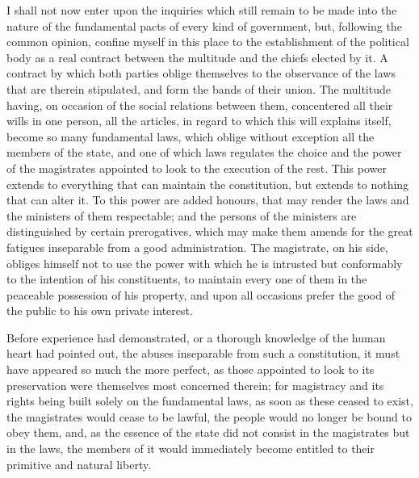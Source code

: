 \documentclass[11pt,twocolumn]{ltugboat}
\begin{document}
I shall not now enter upon the inquiries which still remain to be made
into the nature of the fundamental pacts of every kind of government,
but, following the common opinion, confine myself in this place to the
establishment of the political body as a real contract between the
multitude and the chiefs elected by it. A contract by which both
parties oblige themselves to the observance of the laws that are
therein stipulated, and form the bands of their union. The multitude
having, on occasion of the social relations between them, concentered
all their wills in one person, all the articles, in regard to which
this will explains itself, become so many fundamental laws, which
oblige without exception all the members of the state, and one of
which laws regulates the choice and the power of the magistrates
appointed to look to the execution of the rest. This power extends to
everything that can maintain the constitution, but extends to nothing
that can alter it. To this power are added honours, that may render
the laws and the ministers of them respectable; and the persons of the
ministers are distinguished by certain prerogatives, which may make
them amends for the great fatigues inseparable from a good
administration. The magistrate, on his side, obliges himself not to
use the power with which he is intrusted but conformably to the
intention of his constituents, to maintain every one of them in the
peaceable possession of his property, and upon all occasions prefer
the good of the public to his own private interest.

Before experience had demonstrated, or a thorough knowledge of the
human heart had pointed out, the abuses inseparable from such a
constitution, it must have appeared so much the more perfect, as those
appointed to look to its preservation were themselves most concerned
therein; for magistracy and its rights being built solely on the
fundamental laws, as soon as these ceased to exist, the magistrates
would cease to be lawful, the people would no longer be bound to obey
them, and, as the essence of the state did not consist in the
magistrates but in the laws, the members of it would immediately
become entitled to their primitive and natural liberty.
\end{document}
